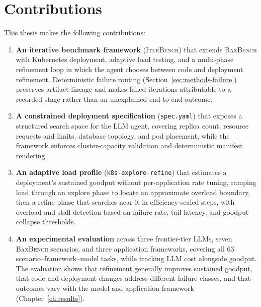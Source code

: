 \section{Contributions}
\label{sec:intro-contributions}

This thesis makes the following contributions:
%
\begin{enumerate}
  \item \textbf{An iterative benchmark framework} (\textsc{IterBench}) that
        extends \textsc{BaxBench} with Kubernetes deployment, adaptive load testing,
        and a multi-phase refinement loop in which the agent chooses between
        code and deployment refinement. Deterministic failure
        routing (Section~\ref{sec:methods-failure}) preserves artifact lineage
        and makes failed iterations attributable to a recorded stage rather
        than an unexplained end-to-end outcome.

  \item \textbf{A constrained deployment specification} (\texttt{spec.yaml})
        that exposes a structured search space for the LLM agent, covering
        replica count, resource requests and limits, database topology, and pod
        placement, while the framework enforces cluster-capacity validation
        and deterministic manifest rendering.

  \item \textbf{An adaptive load profile}
        (\texttt{k8s-\allowbreak explore-\allowbreak refine}) that
        estimates a deployment's sustained goodput without per-application
        rate tuning, ramping load through an
        explore phase to locate an approximate overload boundary, then a
        refine phase that searches near it in efficiency-scaled steps,
        with overload and stall detection based on failure rate, tail
        latency, and goodput collapse thresholds.

  \item \textbf{An experimental evaluation} across three frontier-tier
        LLMs, seven \textsc{BaxBench} scenarios, and three application
        frameworks, covering all 63 scenario--framework--model tasks, while
        tracking LLM cost alongside goodput. The evaluation shows that refinement
        generally improves sustained goodput, that code and deployment changes
        address different failure classes, and that outcomes vary with the
        model and application framework (Chapter~\ref{ch:results}).
\end{enumerate}



